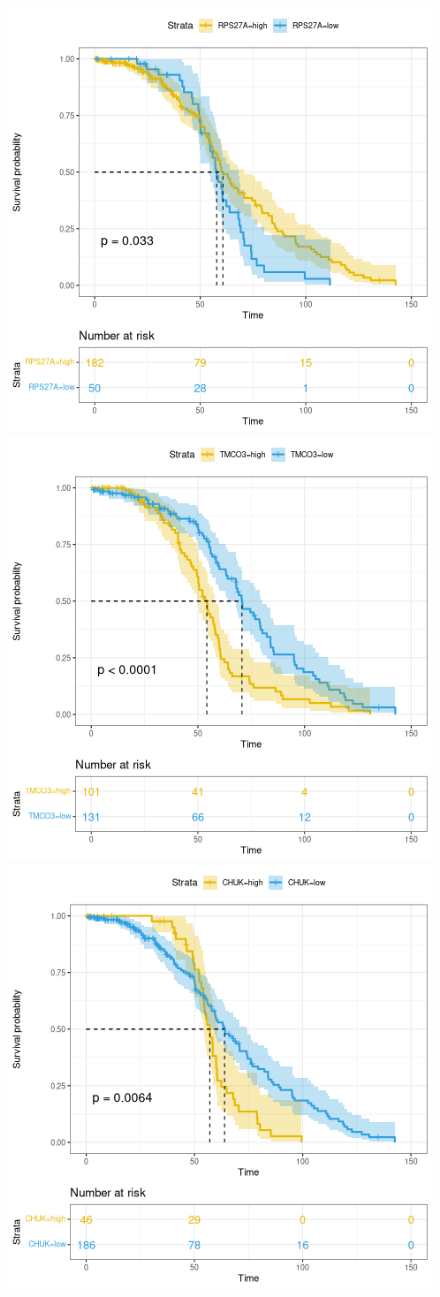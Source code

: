 \documentclass[fleqn,10pt]{SelfArx} %
\begin{document}
\begin{figure}[ht]
\begin{multicols}{2}
	 			\includegraphics[width=0.7\linewidth]{figures/RPS27A.png}
			 	\includegraphics[width=0.7\linewidth]{figures/TMCO3.png}
	 			\includegraphics[width=0.7\linewidth]{figures/CHUK.png}

\end{multicols}
\end{figure}
\end{document}
